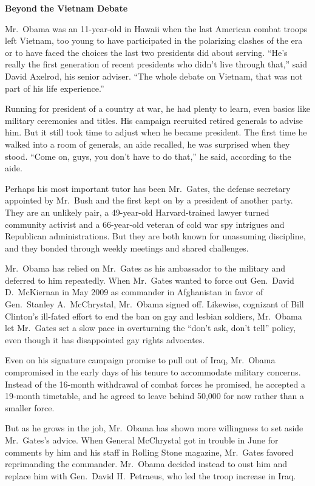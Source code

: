 ﻿\documentclass[12pt]{article}
\begin{document}
\textbf{Beyond the Vietnam Debate}

Mr.~Obama was an 11-year-old in Hawaii when the last American combat troops left Vietnam, too young
to have participated in the polarizing clashes of the era or to have faced the choices the last two
presidents did about serving. ``He's really the first generation of recent presidents who didn't
live through that,'' said David Axelrod, his senior adviser. ``The whole debate on Vietnam, that was
not part of his life experience.''

Running for president of a country at war, he had plenty to learn, even basics like military
ceremonies and titles. His campaign recruited retired generals to advise him. But it still took time
to adjust when he became president. The first time he walked into a room of generals, an aide
recalled, he was surprised when they stood. ``Come on, guys, you don't have to do that,'' he said,
according to the aide.

Perhaps his most important tutor has been Mr.~Gates, the defense secretary appointed by Mr.~Bush and
the first kept on by a president of another party. They are an unlikely pair, a 49-year-old
Harvard-trained lawyer turned community activist and a 66-year-old veteran of cold war spy intrigues
and Republican administrations. But they are both known for unassuming discipline, and they bonded
through weekly meetings and shared challenges.

Mr.~Obama has relied on Mr.~Gates as his ambassador to the military and deferred to him repeatedly.
When Mr.~Gates wanted to force out Gen.~David D.~McKiernan in May 2009 as commander in Afghanistan
in favor of Gen.~Stanley A.~McChrystal, Mr.~Obama signed off. Likewise, cognizant of Bill Clinton's
ill-fated effort to end the ban on gay and lesbian soldiers, Mr.~Obama let Mr.~Gates set a slow pace
in overturning the ``don't ask, don't tell'' policy, even though it has disappointed gay rights
advocates.

Even on his signature campaign promise to pull out of Iraq, Mr.~Obama compromised in the early days
of his tenure to accommodate military concerns. Instead of the 16-month withdrawal of combat forces
he promised, he accepted a 19-month timetable, and he agreed to leave behind 50,000 for now rather
than a smaller force.

But as he grows in the job, Mr.~Obama has shown more willingness to set aside Mr.~Gates's advice.
When General McChrystal got in trouble in June for comments by him and his staff in Rolling Stone
magazine, Mr.~Gates favored reprimanding the commander. Mr.~Obama decided instead to oust him and
replace him with Gen.~David H.~Petraeus, who led the troop increase in Iraq.
\end{document}
